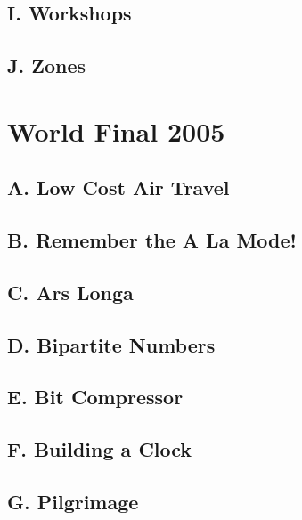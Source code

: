 \subsection{I. Workshops}
\raggedbottom
\hrulefill
\subsection{J. Zones}
\raggedbottom
\hrulefill

\section{World Final 2005}
\subsection{A. Low Cost Air Travel}
\raggedbottom
\hrulefill
\subsection{B. Remember the A La Mode!}
\raggedbottom
\hrulefill
\subsection{C. Ars Longa}
\raggedbottom
\hrulefill
\subsection{D. Bipartite Numbers}
\raggedbottom
\hrulefill
\subsection{E. Bit Compressor}
\raggedbottom
\hrulefill
\subsection{F. Building a Clock}
\raggedbottom
\hrulefill
\subsection{G. Pilgrimage}
\raggedbottom
\hrulefill
